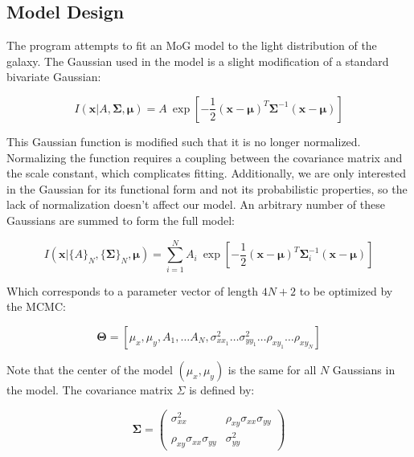 \documentclass[authoryear, 12pt, 5p, times]{elsarticle}
\begin{document}
\subsection{Model Design}

The program attempts to fit an MoG model to the light distribution of the galaxy. The Gaussian used in the model is a slight modification of a standard bivariate Gaussian:

\begin{equation}
I(\boldsymbol{x} | A,\boldsymbol{\Sigma}, \boldsymbol{\mu}) = A \: \exp[-\frac{1}{2}(\boldsymbol{x}-\boldsymbol{\mu})^T \boldsymbol{\Sigma}^{-1} (\boldsymbol{x}-\boldsymbol{\mu})]
\end{equation}

This Gaussian function is modified such that it is no longer normalized. Normalizing the function requires a coupling between the covariance matrix and the scale constant, which complicates fitting. Additionally, we are only interested in the Gaussian for its functional form and not its probabilistic properties, so the lack of normalization doesn't affect our model. An arbitrary number of these Gaussians are summed to form the full model:

\begin{equation}
I(\boldsymbol{x} |\{A\}_N,\{\boldsymbol{\Sigma}\}_N,\boldsymbol{\mu}) = \sum_{i = 1}^{N} A_i \: \exp[-\frac{1}{2}(\boldsymbol{x}-\boldsymbol{\mu})^T \boldsymbol{\Sigma}_{i}^{-1} (\boldsymbol{x}-\boldsymbol{\mu})]
\end{equation}

Which corresponds to a parameter vector of length $4N+2$ to be optimized by the MCMC:

\begin{equation}
\boldsymbol{\Theta} = [\mu_x, \mu_y, A_1, \ldots A_N,\sigma^2_{xx_1} \ldots  \sigma^2_{yy_1} \ldots \rho_{xy_1} \ldots \rho_{xy_N} ]
\end{equation}

Note that the center of the model $(\mu_x, \mu_y)$ is the same for all $N$ Gaussians in the model. The covariance matrix $\Sigma$ is defined by:

\begin{equation}
\boldsymbol{\Sigma} = \left( \begin{array}{cc}
\sigma^2_{xx} & \rho_{xy}\sigma_{xx}\sigma_{yy} \\
\rho_{xy}\sigma_{xx}\sigma_{yy} & \sigma^2_{yy}  \end{array} \right)
\end{equation}
\end{document}
